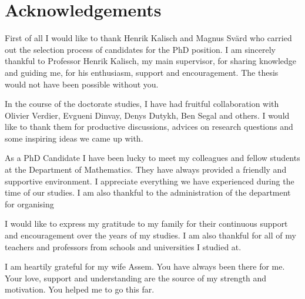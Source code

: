 \chapter{Acknowledgements}

First of all I would like to thank Henrik Kalisch and Magnus Sv\"ard who carried out the selection process of candidates for the PhD position. I am sincerely thankful to Professor Henrik Kalisch, my main supervisor, for sharing knowledge and guiding me, for his enthusiasm, support and encouragement. The thesis would not have been possible without you.


In the course of the doctorate studies, I have had fruitful collaboration with Olivier Verdier, Evgueni Dinvay, Denys Dutykh, Ben Segal and others. I would like to thank them for productive discussions, advices on research questions and some inspiring ideas we came up with. 


As a PhD Candidate I have been lucky to meet my colleagues and fellow students at the Department of Mathematics. They have always provided a friendly and supportive environment. I appreciate everything we have experienced during the time of our studies. I am also thankful to the administration of the department for organising 


I would like to express my gratitude to my family for their continuous support and encouragement over the years of my studies. I am also thankful for all of my teachers and professors from schools and universities I studied at. 


I am heartily grateful for my wife Assem. You have always been there for me. Your love, support and understanding are the source of my strength and motivation. You helped me to go this far. 